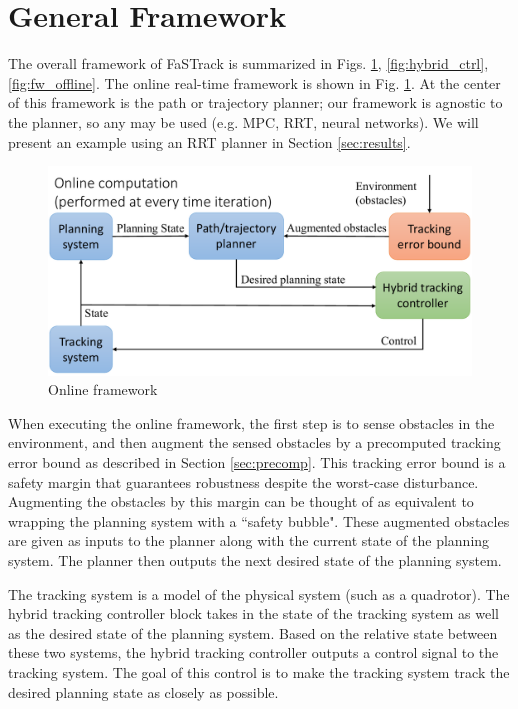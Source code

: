 \section{General Framework \label{sec:framework}}
The overall framework of FaSTrack is summarized in Figs. \ref{fig:fw_online}, \ref{fig:hybrid_ctrl}, \ref{fig:fw_offline}. The online real-time framework is shown in Fig. \ref{fig:fw_online}. At the center of this framework is the path or trajectory planner; our framework is agnostic to the planner, so any may be used (e.g. MPC, RRT, neural networks). We will present an example using an RRT planner in Section \ref{sec:results}.
\begin{figure}[h!]
  \centering
	\includegraphics[width=1\columnwidth]{fig/framework_online}
	\caption{Online framework}
	\label{fig:fw_online}
	\vspace{-.1in}
\end{figure}

When executing the online framework, the first step is to sense obstacles in the environment, and then augment the sensed obstacles by a precomputed tracking error bound as described in Section \ref{sec:precomp}. This tracking error bound is a safety margin that guarantees robustness despite the worst-case disturbance. Augmenting the obstacles by this margin can be thought of as equivalent to wrapping the planning system with a ``safety bubble". These augmented obstacles are given as inputs to the planner along with the current state of the planning system. The planner then outputs the next desired state of the planning system. 

The tracking system is a model of the physical system (such as a quadrotor). The hybrid tracking controller block takes in the state of the tracking system as well as the desired state of the planning system. Based on the relative state between these two systems, the hybrid tracking controller outputs a control signal to the tracking system. The goal of this control is to make the tracking system track the desired planning state as closely as possible.

